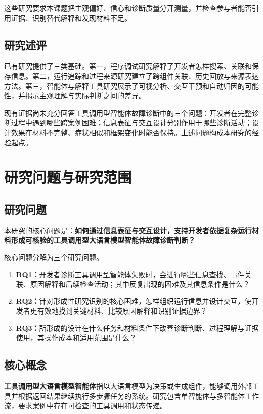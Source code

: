 这些研究要求本课题把主观偏好、信心和诊断质量分开测量，并检查参与者能否引用证据、识别替代解释和发现材料不足。

\subsection{研究述评}

已有研究提供了三类基础。第一，程序调试研究解释了开发者怎样搜索、关联和保存信息。第二，运行追踪和过程来源研究建立了跨组件关联、历史回放与来源表达方法。第三，智能体与解释工具研究展示了可视分析、交互干预和自动归因的可能性，并揭示主观理解与实际判断之间的差异。

现有证据尚未充分回答工具调用型智能体故障诊断中的三个问题：开发者在完整诊断过程中遇到哪些跨案例困难；信息表征与交互设计分别作用于哪些诊断活动；设计效果在材料不完整、症状相似和框架变化时能否保持。上述问题构成本研究的经验起点。

\section{研究问题与研究范围}

\subsection{研究问题}

本研究的核心问题是：\textbf{如何通过信息表征与交互设计，支持开发者依据复杂运行材料形成可核验的工具调用型大语言模型智能体故障诊断判断？}

核心问题分解为三个研究问题。

\begin{enumerate}
  \item \textbf{RQ1：}开发者诊断工具调用型智能体失败时，会进行哪些信息查找、事件关联、原因解释和后续检查活动；其中反复出现的困难及其信息条件是什么？
  \item \textbf{RQ2：}针对形成性研究识别的核心困难，怎样组织运行信息并设计交互，使开发者更有效地找到关键材料、比较原因解释和识别证据边界？
  \item \textbf{RQ3：}所形成的设计在什么任务和材料条件下改善诊断判断、过程理解与证据使用，其操作成本和适用范围是什么？
\end{enumerate}

\subsection{核心概念}

\textbf{工具调用型大语言模型智能体}指以大语言模型为决策或生成组件，能够调用外部工具并根据返回结果继续执行多步骤任务的系统。研究包含单智能体与多智能体工作流，要求案例中存在可检查的工具调用和状态传递。

